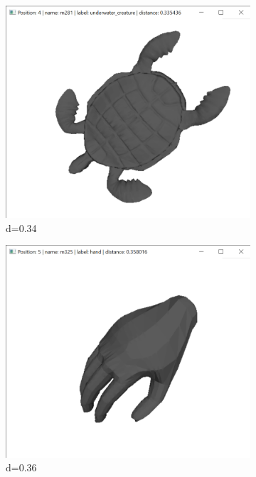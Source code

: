 \documentclass{bigdata}
\begin{document}
\begin{figure}[h!]
  \begin{subfigure}[b]{0.09\linewidth}
    \includegraphics[width=\linewidth]{Pictures/Evaluation/m92/pos4.png}
    \caption*{d=0.34}
  \end{subfigure}
  \begin{subfigure}[b]{0.09\linewidth}
    \includegraphics[width=\linewidth]{Pictures/Evaluation/m92/pos5.png}
    \caption*{d=0.36}
  \end{subfigure}
  \begin{subfigure}[b]{0.09\linewidth}

\end{subfigure}
\end{figure}
\end{document}
